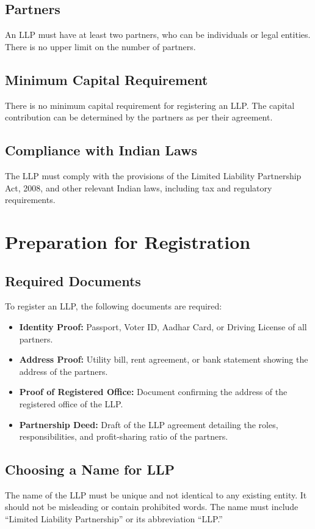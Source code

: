 \documentclass{article}
\begin{document}
\section{Partners}
An LLP must have at least two partners, who can be individuals or legal entities. There is no upper limit on the number of partners.

\section{Minimum Capital Requirement}
There is no minimum capital requirement for registering an LLP. The capital contribution can be determined by the partners as per their agreement.

\section{Compliance with Indian Laws}
The LLP must comply with the provisions of the Limited Liability Partnership Act, 2008, and other relevant Indian laws, including tax and regulatory requirements.

\chapter{Preparation for Registration}
\section{Required Documents}
To register an LLP, the following documents are required:
\begin{itemize}
    \item \textbf{Identity Proof:} Passport, Voter ID, Aadhar Card, or Driving License of all partners.
    \item \textbf{Address Proof:} Utility bill, rent agreement, or bank statement showing the address of the partners.
    \item \textbf{Proof of Registered Office:} Document confirming the address of the registered office of the LLP.
    \item \textbf{Partnership Deed:} Draft of the LLP agreement detailing the roles, responsibilities, and profit-sharing ratio of the partners.
\end{itemize}

\section{Choosing a Name for LLP}
The name of the LLP must be unique and not identical to any existing entity. It should not be misleading or contain prohibited words. The name must include “Limited Liability Partnership” or its abbreviation “LLP.”
\end{document}
